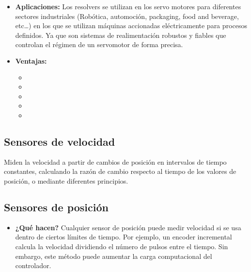 \begin{itemize}
	\item \textbf{Aplicaciones:} Los resolvers se utilizan en los servo motores para diferentes sectores industriales (Robótica, automoción, packaging, food and beverage, etc…) en los que se utilizan máquinas accionadas eléctricamente para procesos definidos. Ya que son sistemas de realimentación robustos y fiables que controlan el régimen de un servomotor de forma precisa.
	\item \textbf{Ventajas:}
	\begin{itemize}
		\item {} 
		\item {} 
		\item {} 
		\item {}
		\item {}
	\end{itemize}
\end{itemize}
	\begin{figure}[h]
	\centering
\end{figure}



\subsection{Sensores de velocidad} Miden la velocidad a partir de cambios de posición en intervalos de tiempo constantes, calculando la razón de cambio respecto al tiempo de los valores de posición, o mediante diferentes principios.
\subsection*{Sensores de posición}
\begin{itemize}
	\item \textbf{¿Qué hacen?} Cualquier sensor de posición puede medir velocidad si se usa dentro de ciertos límites de tiempo. Por ejemplo, un encoder incremental calcula la velocidad dividiendo el número de pulsos entre el tiempo. Sin embargo, este método puede aumentar la carga computacional del controlador.
	
\end{itemize}
